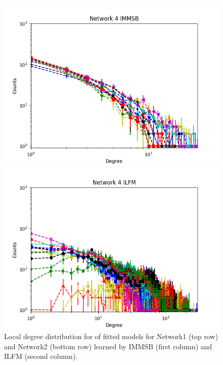\begin{figure}[h]
\begin{minipage}{0.24\textwidth}
            \includegraphics[width=\textwidth]{img/corpus/immsb_network4_1}
        \end{minipage}
        \begin{minipage}{0.24\textwidth}
            \includegraphics[width=\textwidth]{img/corpus/ilfm_network4_1}
        \end{minipage}
        \caption {Local degree distribution for of fitted models for Network1 (top row) and Network2 (bottom row) learned by IMMSB (first column) and ILFM (second column).} 
	\label{fig:me_local}
\end{figure}

